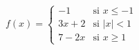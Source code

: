 \item $f(x) = \begin{cases} -1 & \text{si } x \le -1 \\ 3x + 2 & \text{si } |x| < 1 \\ 7 - 2x & \text{si } x \ge 1 \end{cases}$
